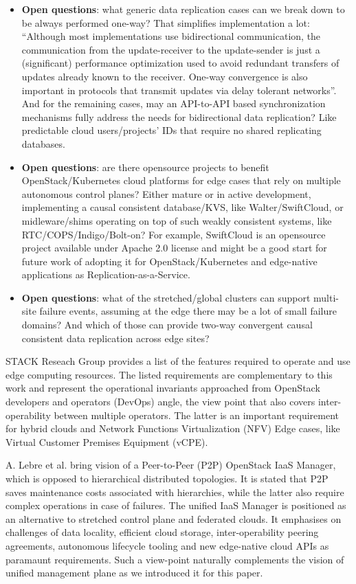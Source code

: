 \documentclass[conference]{IEEEtran}
\begin{document}
\begin{itemize}
  \item \textbf{Open questions}: what generic data replication cases can we
    break down to be always performed one-way? That simplifies implementation a
    lot: ``Although most implementations use bidirectional communication, the
    communication from the update-receiver to the update-sender is just a
    (significant) performance optimization used to avoid redundant transfers of
    updates already known to the receiver. One-way convergence is also
    important in protocols that transmit updates via delay tolerant
    networks''\cite{b2}. And for the remaining cases, may an API-to-API based
    synchronization mechanisms fully address the needs for bidirectional data
    replication? Like predictable cloud users/projects' IDs that require no
    shared replicating databases.
  \item \textbf{Open questions}: are there opensource projects to benefit
    OpenStack/Kubernetes cloud platforms for edge cases that rely on multiple
    autonomous control planes? Either mature or in active development,
    implementing a causal consistent database/KVS, like Walter/SwiftCloud, or
    midleware/shims operating on top of such weakly consistent systems, like
    RTC/COPS/Indigo/Bolt-on? For example, SwiftCloud is an opensource project
    available under Apache 2.0 license and might be a good start for future
    work of adopting it for OpenStack/Kubernetes and edge-native applications
    as Replication-as-a-Service.
  \item \textbf{Open questions}: what of the stretched/global clusters can
    support multi-site failure events, assuming at the edge there may be a lot
    of small failure domains? And which of those can provide two-way
    convergent causal consistent data replication across edge sites?
\end{itemize}

STACK Reseach Group\cite{b8} provides a list of the features required to
operate and use edge computing resources. The listed requirements are
complementary to this work and represent the operational invariants approached
from OpenStack developers and operators (DevOps) angle, the view point that
also covers inter-operability between multiple operators. The latter is an
important requirement for hybrid clouds and Network Functions Virtualization
(NFV) Edge cases, like Virtual Customer Premises Equipment (vCPE).

A. Lebre et al.\cite{b9} bring vision of a Peer-to-Peer (P2P) OpenStack IaaS
Manager, which is opposed to hierarchical distributed topologies. It is stated
that P2P saves maintenance costs associated with hierarchies, while the latter
also require complex operations in case of failures. The unified IaaS Manager
is positioned as an alternative to stretched control plane and federated
clouds. It emphasises on challenges of data locality, efficient cloud storage,
inter-operability peering agreements, autonomous lifecycle tooling and new
edge-native cloud APIs as paramaunt requirements. Such a view-point naturally
complements the vision of unified management plane as we introduced it for this
paper.
\end{document}
